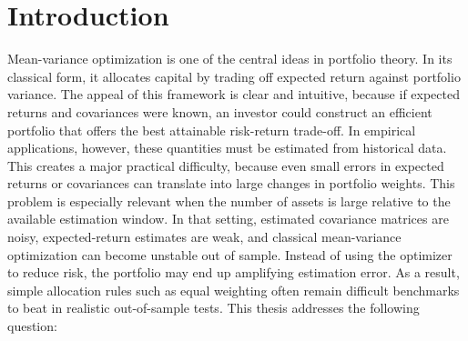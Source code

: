 \documentclass[12pt]{article}
\def\spacingset#1{\renewcommand{\baselinestretch}%
{#1}\small\normalsize} \spacingset{1}
\begin{document}
\begin{abstract}
\noindent Mean-variance optimization often performs poorly out of sample because covariance-matrix inversion can amplify estimation error, producing unstable and concentrated portfolios. This thesis introduces Hierarchical Mean Variance Allocation (HMVA), a long-only portfolio-construction method that targets risk-adjusted performance without directly inverting an estimated covariance matrix. HMVA builds a top-down binary tree by splitting assets to minimize correlation between equal-weighted sub-portfolios, then allocates capital recursively using cluster-level Sharpe proxies based on return estimates. When no positive return estimate is available, it falls back to inverse-volatility bisection. A latent weight filter then blends target weights with prior holdings to reduce turnover when risk estimates are diffuse and to respond more aggressively when return signals shift. HMVA is tested in a fully point-in-time backtest of the top-100 S\&P 500 constituents from July 2000 to January 2024 against mean-variance, minimum-variance, hierarchical risk-parity, and passive benchmarks. HMVA achieves the highest full-sample Sharpe ratio of 0.616, outperforming all benchmarks in full-sample Sharpe ratio on point estimates. Pairwise Sharpe-ratio differences are positive against all comparators in the HMVA hypothesis family, but the studentized bootstrap confidence intervals include zero after multiple-testing correction, so the statistical evidence should be interpreted cautiously.
\end{abstract}


\newpage
\tableofcontents

\newpage
\spacingset{1.45}

\section{Introduction}
\label{sec:introduction}

Mean-variance optimization is one of the central ideas in portfolio theory. In its classical form, it allocates capital by trading off expected return against portfolio variance. The appeal of this framework is clear and intuitive, because if expected returns and covariances were known, an investor could construct an efficient portfolio that offers the best attainable risk-return trade-off. In empirical applications, however, these quantities must be estimated from historical data. This creates a major practical difficulty, because even small errors in expected returns or covariances can translate into large changes in portfolio weights. This problem is especially relevant when the number of assets is large relative to the available estimation window. In that setting, estimated covariance matrices are noisy, expected-return estimates are weak, and classical mean-variance optimization can become unstable out of sample. Instead of using the optimizer to reduce risk, the portfolio may end up amplifying estimation error. As a result, simple allocation rules such as equal weighting often remain difficult benchmarks to beat in realistic out-of-sample tests. This thesis addresses the following question: 
\end{document}
